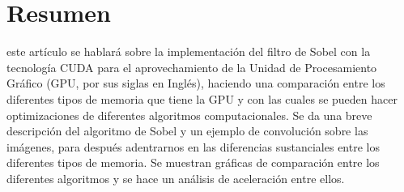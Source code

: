 \documentclass[10pt,journal,compsoc]{IEEEtran}
\begin{document}
\ifCLASSOPTIONcompsoc
{}
\else
\section{Resumen}
\label{sec:resumen}
\fi




% 
% 
% 
% 
 este artículo se hablará sobre la implementación del filtro de Sobel con la tecnología CUDA para el aprovechamiento de la Unidad de Procesamiento Gráfico (GPU, por sus siglas en Inglés), haciendo una comparación entre los diferentes tipos de memoria que tiene la GPU y con las cuales se pueden hacer optimizaciones de diferentes algoritmos computacionales. Se da una breve descripción del algoritmo de Sobel y un ejemplo de convolución sobre las imágenes, para después adentrarnos en las diferencias sustanciales entre los diferentes tipos de memoria. Se muestran gráficas de comparación entre los diferentes algoritmos y se hace un análisis de aceleración entre ellos.
\end{document}
